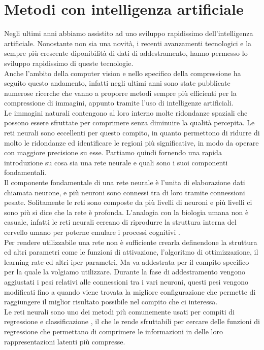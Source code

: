 \chapter{Metodi con intelligenza artificiale}
Negli ultimi anni abbiamo assistito ad uno sviluppo rapidissimo dell’intelligenza artificiale. Nonostante non sia una novità, i recenti avanzamenti tecnologici e la sempre più crescente diponibilità di dati di addestramento, hanno permesso lo sviluppo rapidissimo di queste tecnologie.\\
Anche l’ambito della computer vision e nello specifico della compressione ha seguito questo andamento, infatti negli ultimi anni sono state pubblicate numerose ricerche che vanno a proporre metodi sempre più efficienti per la compressione di immagini, appunto tramite l’uso di intelligenze artificiali.\\
Le immagini naturali contengono al loro interno molte ridondanze spaziali che possono essere sfruttate per comprimere senza diminuire la qualità percepita. Le reti neurali sono eccellenti per questo compito, in quanto permettono di ridurre di molto le ridondanze ed identificare le regioni più significative, in modo da operare con maggiore precisione su esse.
Partiamo quindi fornendo una rapida introduzione su cosa sia una rete neurale e quali sono i suoi componenti fondamentali.\\
Il componente fondamentale di una rete neurale è l’unita di elaborazione dati chiamata neurone, e più neuroni sono connessi tra di loro tramite connessioni pesate. Solitamente le reti sono composte da più livelli di neuroni e più livelli ci sono più si dice che la rete è profonda. L’analogia con la biologia umana non è casuale, infatti le reti neurali cercano di riprodurre la struttura interna del cervello umano per poterne emulare i processi cognitivi \cite{sadeeq2021image}.\\
Per rendere utilizzabile una rete non è sufficiente crearla definendone la struttura ed altri parametri come le funzioni di attivazione, l’algoritmo di ottimizzazione, il learning rate ed altri iper parametri, Ma va addestrata per il compito specifico per la quale la volgiamo utilizzare. Durante la fase di addestramento vengono aggiustati i pesi relativi alle connessioni tra i vari neuroni, questi pesi vengono modificati fino a quando viene trovata la migliore configurazione che permette di raggiungere il miglior risultato possibile nel compito che ci interessa.\\
Le reti neurali sono uno dei metodi più comunemente usati per compiti di regressione e classificazione \cite{sadeeq2021image}, il che le rende sfruttabili per cercare delle funzioni di regressione che permettano di comprimere le informazioni in delle loro rappresentazioni latenti più compresse.
